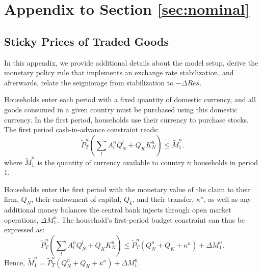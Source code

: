 \section{Appendix to Section \ref{sec:nominal}}\label{Appendix_Nominal_Rigidities}
  

\subsection{Sticky Prices of Traded Goods
  \label{Appendix_RigidPrices}}

In this appendix, we provide additional details about the model setup,
derive the monetary policy rule that implements an exchange rate
stabilization, and afterwards, relate the seigniorage from
stabilization to $-\Delta Res$.

Households enter each period with a fixed quantity of domestic
currency, and all goods consumed in a given country must be purchased
using this domestic currency. In the first period, households use
their currency to purchase stocks. The first period cash-in-advance
constraint reads:
\begin{equation*}
  \tilde{P}^n_T \left( \sum_l A^n_l Q^l_N + Q_K K^n_N \right) \le \tilde M^n_1.
\end{equation*}
where $\tilde M^n_1$ is the quantity of currency available to country
$n$ households in period 1.

Households enter the first period with the monetary value of the claim
to their firm, $Q_N$, their endowment of capital, $Q_k$, and their
transfer, $\kappa^n$, as well as any additional money balances the
central bank injects through open market operations, $\Delta M^n_1$.
The household's first-period budget constraint can thus be expressed
as:
\begin{equation}
  \tilde{P}^n_T \left( \sum_l A^n_l Q^l_N + Q_K K^n_N \right)
  \le \tilde{P}^n_T \left( Q^n_N + Q_K + \kappa^n \right) + \Delta M^n_1.
  \label{eqn:bc_nom_1}
\end{equation}
Hence,
$\tilde M^n_1 = \tilde{P}^n_T \left( Q^n_N + Q_K + \kappa^n \right) +
\Delta M^n_1$.

